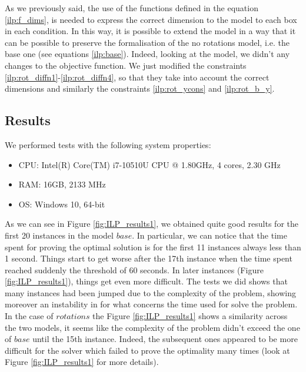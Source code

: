     As we previously said, the use of the functions defined in the equation \ref{ilp:f_dims}, is 
    needed to express the correct dimension to the model to each box in each condition. In this way,
    it is possible to extend the model in a way that it can be possible to preserve the 
    formalisation of the no rotations model, i.e. the base one (see equations \ref{ilp:base}).
    Indeed, looking at the model, we didn't any changes to the objective function. We just modified
    the constraints \ref{ilp:rot_diffn1}-\ref{ilp:rot_diffn4}, so that they take into account the 
    correct dimensions and similarly the constraints \ref{ilp:rot_ycons} and \ref{ilp:rot_b_y}.


\subsection{Results}
    We performed tests with the following system properties:
    \begin{itemize}
        \item CPU: Intel(R) Core(TM) i7-10510U CPU @ 1.80GHz, 4 cores, 2.30 GHz
        \item RAM: 16GB, 2133 MHz
        \item OS: Windows 10, 64-bit
    \end{itemize}

    As we can see in Figure \ref{fig:ILP_results1}, we obtained quite good results for the 
    first 20 instances in the model \(base\). In particular, we can notice that the time spent for
    proving the optimal solution is for the first 11 instances always less than 1 second. Things 
    start to get worse after the 17th instance when the time spent reached suddenly the
    threshold of 60 seconds. In later instances (Figure \ref{fig:ILP_results1}), things get even 
    more difficult. The tests we did shows that many instances had been jumped due to the 
    complexity of the problem, showing moreover an instability in for what concerns the time used 
    for solve the problem. \\
    
    In the case of \(rotations\) the Figure \ref{fig:ILP_results1} shows a similarity across the
    two models, it seems like the complexity of the problem didn't exceed the one of \(base\)
    until the 15th instance. Indeed, the subsequent ones appeared to be more difficult for the
    solver which failed to prove the optimality many times (look at Figure \ref{fig:ILP_results1} 
    for more details). \\ 

